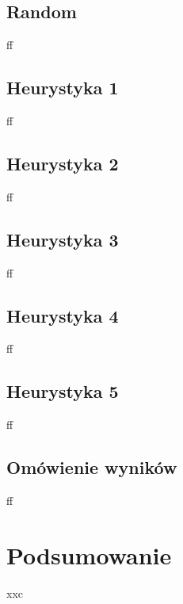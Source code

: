 \documentclass[a4paper,10pt]{article}
\begin{document}
    \subsection{Random}
    ff
    
    \subsection{Heurystyka  1}
    ff
    
    \subsection{Heurystyka 2}
    ff
    
    \subsection{Heurystyka 3}
    ff
    
    \subsection{Heurystyka 4}
    ff
    
    \subsection{Heurystyka 5}
    ff
    
    \subsection{Omówienie wyników}
    ff
    
    \newpage
    \justify
    \section{Podsumowanie}
    xxc
    
\end{document}
